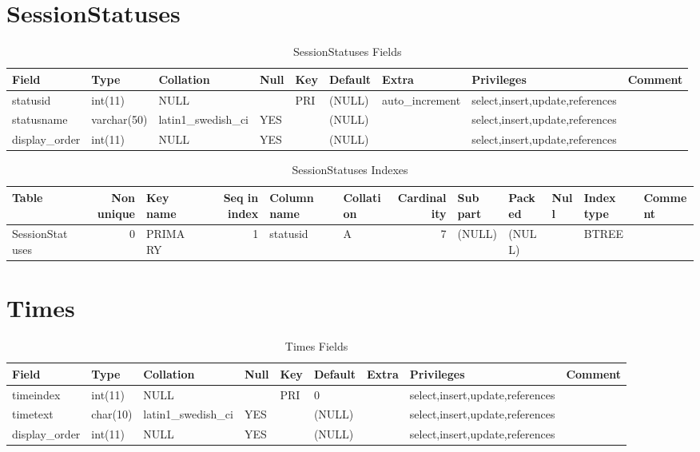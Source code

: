 \documentclass[captions=tablesignature]{scrartcl}
\begin{document}
\section{SessionStatuses}
\label{sec-30}

\begin{table}[htb]
\caption{\label{tbl:sessionstatusesfields}SessionStatuses Fields}
\centering
\begin{tabular}{lllllllll}
\hline
Field & Type & Collation & Null & Key & Default & Extra & Privileges & Comment\\
\hline
statusid & int(11) & NULL &  & PRI & (NULL) & auto\_increment & select,insert,update,references & \\
statusname & varchar(50) & latin1\_swedish\_ci & YES &  & (NULL) &  & select,insert,update,references & \\
display\_order & int(11) & NULL & YES &  & (NULL) &  & select,insert,update,references & \\
\hline
\end{tabular}
\end{table}

\begin{table}[htb]
\caption{\label{tbl:sessionstatusesindexes}SessionStatuses Indexes}
\centering
\begin{tabular}{lrlrllrlllll}
\hline
Table & Non unique & Key name & Seq in index & Column name & Collation & Cardinality & Sub part & Packed & Null & Index type & Comment\\
\hline
SessionStatuses & 0 & PRIMARY & 1 & statusid & A & 7 & (NULL) & (NULL) &  & BTREE & \\
\hline
\end{tabular}
\end{table}
\section{Times}
\label{sec-31}

\begin{table}[htb]
\caption{\label{tbl:timessfields}Times Fields}
\centering
\begin{tabular}{lllllllll}
\hline
Field & Type & Collation & Null & Key & Default & Extra & Privileges & Comment\\
\hline
timeindex & int(11) & NULL &  & PRI & 0 &  & select,insert,update,references & \\
timetext & char(10) & latin1\_swedish\_ci & YES &  & (NULL) &  & select,insert,update,references & \\
display\_order & int(11) & NULL & YES &  & (NULL) &  & select,insert,update,references & \\
\hline
\end{tabular}
\end{table}
\end{document}
